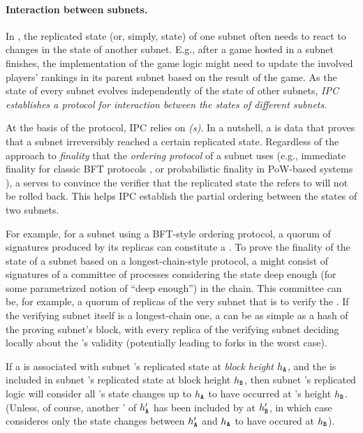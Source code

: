 \paragraph{Interaction between subnets.}
In \ipc, the replicated state (or, simply, state) of one subnet often needs to react to changes in the state of another subnet.
E.g., after a game hosted in a subnet finishes, the implementation of the game logic might need to update the involved players' rankings in its parent subnet based on the result of the game.
As the state of every subnet evolves independently of the state of other subnets,
\emph{IPC establishes a protocol for interaction between the states of different subnets}.

At the basis of the protocol, IPC relies on  \emph{\pofsFull ({\pof}s)}.
In a nutshell, a \pof is data that proves that a subnet irreversibly reached a certain replicated state.
Regardless of the approach to \emph{finality} that the  \emph{ordering protocol} of a subnet uses (e.g., immediate finality for classic BFT protocols \cite{Algorand}, or probabilistic finality in PoW-based systems \cite{nakamoto2008bitcoin}),
a \pof serves to convince the verifier that the replicated state the \pof refers to will not be rolled back. This helps IPC establish the partial ordering between the states of two subnets. 


For example, for a subnet using a BFT-style ordering protocol, a quorum of signatures produced by its replicas can constitute a \pof.
To prove the finality of the state of a subnet based on a longest-chain-style protocol,
a \pof might consist of signatures of a committee of processes considering the state deep enough (for some parametrized notion of ``deep enough'') in the chain.
This committee can be, for example, a quorum of replicas of the very subnet that is to verify the \pof.
If the verifying subnet itself is a longest-chain one, a \pof can be as simple as a hash of the proving subnet's block,
with every replica of the verifying subnet deciding locally about the \pof's validity (potentially leading to forks in the worst case).

If a \pof is associated with subnet 's replicated state at \emph{block height} $h_{\textbf{\texttt{A}}}$,
and the \pof is included in subnet 's replicated state at block height $h_{\textbf{\texttt{B}}}$,
then subnet 's replicated logic will consider all 's state changes up to $h_{\textbf{\texttt{A}}}$
to have occurred at 's height $h_{\textbf{\texttt{B}}}$.
(Unless, of course, another \pof' of $h'_{\textbf{\texttt{A}}}$ has been included by  at $h'_{\textbf{\texttt{B}}}$,
in which case  consideres only the state changes between $h'_{\textbf{\texttt{A}}}$ and $h_{\textbf{\texttt{A}}}$ to have occured at $h_{\textbf{\texttt{B}}}$).

